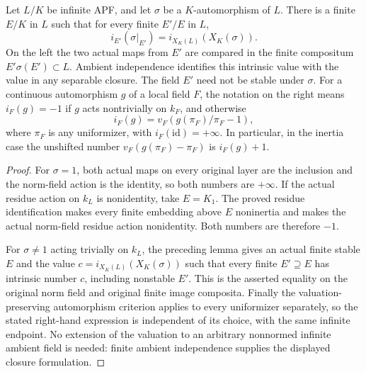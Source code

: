 \begin{proposition}
\label{fw:ramification-transfer}
\leanok
Let $L/K$ be infinite APF, and let $\sigma$ be a $K$-automorphism of $L$.
There is a finite $E/K$ in $L$ such that for every finite $E'/E$ in $L$,
\[
 i_{E'}(\sigma|_{E'})=i_{X_K(L)}(X_K(\sigma)).
\]
On the left the two actual maps from $E'$ are compared in the finite
compositum $E'\sigma(E')\subset L$. Ambient independence identifies
this intrinsic value with the value in any separable closure.
The field $E'$ need not be stable under $\sigma$.
For a continuous automorphism $g$ of a local field $F$, the notation on
the right means $i_F(g)=-1$ if $g$ acts nontrivially on $k_F$, and otherwise
\[
 i_F(g)=v_F(g(\pi_F)/\pi_F-1),
\]
where $\pi_F$ is any uniformizer, with $i_F(\mathrm{id})=+\infty$.
In particular, in the inertia case the unshifted number
$v_F(g(\pi_F)-\pi_F)$ is $i_F(g)+1$.
\end{proposition}
\begin{proof}
For $\sigma=1$, both actual maps on every original layer are the
inclusion and the norm-field action is the identity, so both numbers
are $+\infty$.
If the actual residue action on $k_L$ is nonidentity, take $E=K_1$.
The proved residue identification makes every finite embedding above
$E$ noninertia and makes the actual norm-field residue action
nonidentity. Both numbers are therefore $-1$.

For $\sigma\ne1$ acting trivially on $k_L$, the preceding lemma gives
an actual finite stable $E$ and the value
$c=i_{X_K(L)}(X_K(\sigma))$ such that every finite $E'\supseteq E$
has intrinsic number $c$, including nonstable $E'$. This is the
asserted equality on the original norm field and original finite
image composita. Finally the valuation-preserving automorphism
criterion applies to every uniformizer separately, so the stated
right-hand expression is independent of its choice, with the same
infinite endpoint. No extension of the valuation to an arbitrary
nonnormed infinite ambient field is needed: finite ambient
independence supplies the displayed closure formulation.
\end{proof}

